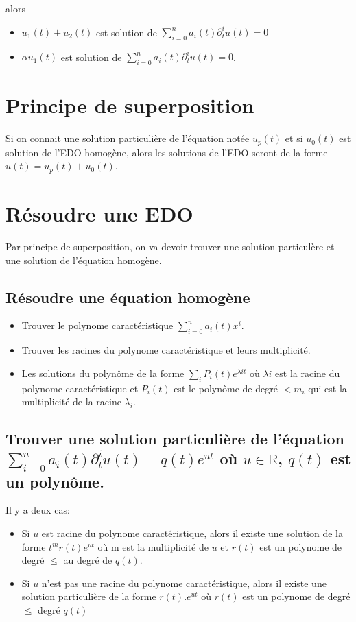 \documentclass[a4paper,11pt]{report}
\begin{document}
alors 
\begin{itemize}
\item $u_1(t) + u_2(t)$ est solution de $\sum\limits_{i=0}^n a_i(t) \partial_t^i u(t) = 0$
\item $\alpha u_1(t)$ est solution de $\sum\limits_{i=0}^n a_i(t) \partial_t^i u(t) = 0$.
\end{itemize}

\section{Principe de superposition}
Si on connait une solution particulière de l'équation notée $u_p(t)$ et si $u_0(t)$ est solution de l'EDO homogène, alors les solutions de l'EDO seront de la forme $u(t) = u_p(t) + u_0(t)$.

\newpage
\section{Résoudre une EDO}
Par principe de superposition, on va devoir trouver une solution particulère et une solution de l'équation homogène.
\subsection{Résoudre une équation homogène}
\begin{itemize}
	\item Trouver le polynome caractéristique $\sum\limits_{i=0}^n a_i(t) x^i$.
	\item Trouver les racines du polynome caractéristique et leurs multiplicité.
	\item Les solutions du polynôme de la forme $\sum\limits_{i} P_i(t) e^{\lambda it}$ où $\lambda i$ est la racine du polynome caractéristique et $P_i(t)$ est le polynôme de degré $<m_i$ qui est la multiplicité de la racine $\lambda_i$.
\end{itemize}

\subsection{Trouver une solution particulière de l'équation $\sum\limits_{i=0}^n a_i(t)\partial_t^iu(t)=q(t)e^{ut}$ où $u\in\mathbb{R}$, $q(t)$ est un polynôme.}
Il y a deux cas:
\begin{itemize}
	\item Si $u$ est racine du polynome caractéristique, alors il existe une solution de la forme $t^m r(t) e^{ut}$ où m est la multiplicité de $u$ et $r(t)$ est un polynome de degré $\le$ au degré de $q(t)$.
	\item Si $u$ n'est pas une racine du polynome caractéristique, alors il existe une solution particulière de la forme $r(t) .e^{ut}$ où $r(t)$ est un polynome de degré $\le$ degré $q(t)$
\end{itemize}
\end{document}
